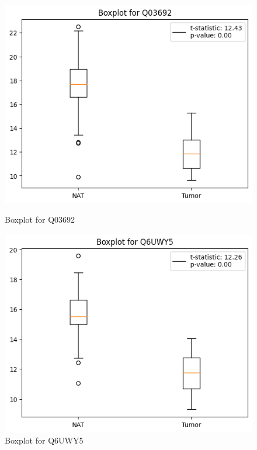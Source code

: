 \documentclass[a4paper,12pt]{article}
\begin{document}
\begin{figure}[H]
\begin{minipage}[b]{0.32\textwidth}
		\label{fig:boxplot_Q6UWY5}
	\end{minipage}
	\hfill
	\begin{minipage}[b]{0.32\textwidth}
		\centering
		\includegraphics[width=\textwidth]{images/3.png}
		\caption{Boxplot for Q03692}

		\label{fig:boxplot_Q92598}
	\end{minipage}

	\vspace{1em}
	\begin{minipage}[b]{0.4\textwidth}
		\centering
		\includegraphics[width=\textwidth]{images/4.png}
		\caption{Boxplot for Q6UWY5}


\end{minipage}
\end{figure}
\end{document}

